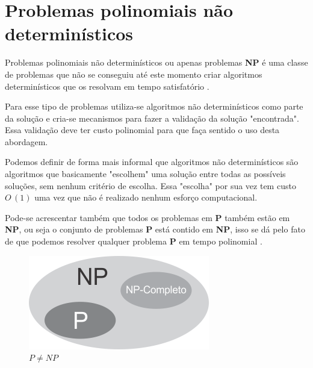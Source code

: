 \section{Problemas polinomiais não determinísticos}
Problemas polinomiais não determinísticos ou apenas problemas \textbf{NP} é uma classe de problemas que não se conseguiu até este momento criar algoritmos determinísticos que os resolvam em tempo satisfatório \cite{goodrichprojeto}. 

Para esse tipo de problemas utiliza-se algoritmos não determinísticos como parte da solução e cria-se mecanismos para fazer a validação da solução "encontrada". Essa validação deve ter custo polinomial para que faça sentido o uso desta abordagem. 

Podemos definir de forma mais informal que algoritmos não determinísticos são algoritmos que basicamente "escolhem" uma solução entre todas as possíveis soluções, sem nenhum critério de escolha. Essa "escolha" por sua vez tem custo $O\,(1)$ uma vez que não é realizado nenhum esforço computacional.

Pode-se acrescentar também que todos os problemas em \textbf{P} também estão em \textbf{NP}, ou seja o conjunto de problemas \textbf{P} está contido em \textbf{NP}, isso se dá pelo fato de que podemos resolver qualquer problema \textbf{P} em tempo polinomial \cite{leisersonalgoritmos}.

\begin{figure}[H]
	\centering
	\label{fig1}
	\includegraphics[scale=2]{./figuras/figProblemas.png}
	\caption{ $P \neq NP$ \cite{VIEIRA2001}}
\end{figure}